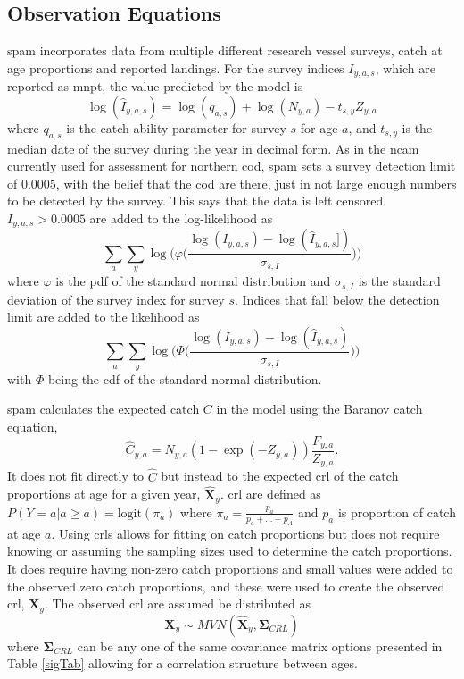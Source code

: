 \documentclass[11pt]{article}\usepackage[]{graphicx}\usepackage[]{color}
\begin{document}
\subsection{Observation Equations}
\acrshort{spam} incorporates data from multiple different research vessel surveys, catch at age proportions and reported landings. For the survey indices $I_{y,a,s}$, which are reported as \acrfull{mnpt}, the value predicted by the model is 
\begin{equation}
	\log(\hat{I}_{y,a,s}) = \log(q_{a,s}) + \log(N_{y,a}) - t_{s,y}Z_{y,a}
\end{equation}
where $q_{a,s}$ is the catch-ability parameter for survey $s$ for age $a$, and $t_{s,y}$ is the median date of the survey during the year in decimal form. As in the \acrfull{ncam} currently used for assessment for northern cod, \acrshort{spam} sets a survey detection limit of 0.0005, with the belief that the cod are there, just in not large enough numbers to be detected by the survey\cite{Cadigan2016A-state-space-s}. This says that the data is left censored. $I_{y,a,s} > 0.0005$ are added to the log-likelihood as
\begin{equation}
\sum_a\sum_y \log\bigg(\varphi\bigg(\frac{\log(I_{y,a,s})-\log(\hat{I}_{y,a,s}])}{\sigma_{s,I}	}\bigg)\bigg)
\end{equation}
where $\varphi$ is the \acrshort{pdf} of the standard normal distribution and $\sigma_{s,I}$ is the standard deviation of the survey index for survey $s$. Indices that fall below the detection limit are added to the likelihood as
\begin{equation}\label{surBound}
\sum_a\sum_y \log\bigg(\Phi\bigg(\frac{\log(I_{y,a,s})-\log(\hat{I}_{y,a,s})}{\sigma_{s,I}	}\bigg)\bigg)	
\end{equation}
with $\Phi$ being the \acrfull{cdf} of the standard normal distribution.

\acrshort{spam} calculates the expected catch $C$ in the model using the Baranov catch equation,
\begin{equation}
	\hat{C}_{y,a} = N_{y,a}(1-\exp(-Z_{y,a}))\frac{F_{y,a}}{Z_{y,a}}.
\end{equation}
It does not fit directly to $\hat{C}$ but instead to the expected \acrfull{crl} of the catch proportions at age for a given year, $\bm{\hat{X}}_y$. \acrshort{crl} are defined as $P(Y = a | a \geq a) = \text{logit}(\pi_a)$ where $\pi_a = \frac{p_a}{p_a+\dots+p_A}$ and $p_a$ is proportion of catch at age $a$. Using \acrshort{crl}s allows for fitting on catch proportions but does not require knowing or assuming the sampling sizes used to determine the catch proportions. It does require having non-zero catch proportions and small values were added to the observed zero catch proportions, and these were used to create the observed \acrshort{crl}, $\bm{X}_y$. The observed \acrshort{crl} are assumed be distributed as
\begin{equation}
	\bm{X}_y \sim MVN(\hat{\bm{X}}_y,\bm{\Sigma}_{CRL})
\end{equation}
where $\bm{\Sigma}_{CRL}$ can be any one of the same covariance matrix options presented in Table \ref{sigTab} allowing for a correlation structure between ages.
\end{document}

